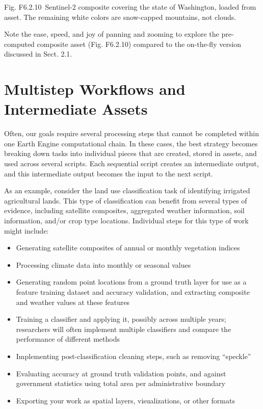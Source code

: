 \documentclass[
  letterpaper,
  DIV=11,
  numbers=noendperiod]{scrreprt}
\providecommand{\tightlist}{%
  \setlength{\itemsep}{0pt}\setlength{\parskip}{0pt}}\usepackage{longtable,booktabs,array}
\begin{document}
Fig. F6.2.10~Sentinel-2 composite covering the state of Washington,
loaded from asset. The remaining white colors are snow-capped mountains,
not clouds.

Note the ease, speed, and joy of panning and zooming to explore the
pre-computed composite asset (Fig. F6.2.10) compared to the on-the-fly
version discussed in Sect. 2.1.

\hypertarget{multistep-workflows-and-intermediate-assets}{%
\section{Multistep Workflows and Intermediate
Assets}\label{multistep-workflows-and-intermediate-assets}}

Often, our goals require several processing steps that cannot be
completed within one Earth Engine computational chain. In these cases,
the best strategy becomes breaking down tasks into individual pieces
that are created, stored in assets, and used across several scripts.
Each sequential script creates an intermediate output, and this
intermediate output becomes the input to the next script.

As an example, consider the land use classification task of identifying
irrigated agricultural lands. This type of classification can benefit
from several types of evidence, including satellite composites,
aggregated weather information, soil information, and/or crop type
locations. Individual steps for this type of work might include:

\begin{itemize}
\tightlist
\item
  Generating satellite composites of annual or monthly vegetation
  indices
\item
  Processing climate data into monthly or seasonal values
\item
  Generating random point locations from a ground truth layer for use as
  a feature training dataset and accuracy validation, and extracting
  composite and weather values at these features
\item
  Training a classifier and applying it, possibly across multiple years;
  researchers will often implement multiple classifiers and compare the
  performance of different methods
\item
  Implementing post-classification cleaning steps, such as removing
  ``speckle''
\item
  Evaluating accuracy at ground truth validation points, and against
  government statistics using total area per administrative boundary
\item
  Exporting your work as spatial layers, visualizations, or other
  formats
\end{itemize}
\end{document}
